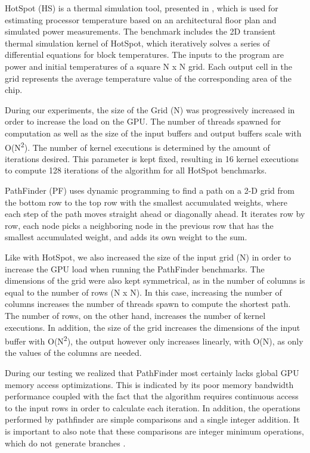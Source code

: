 HotSpot (HS) is a thermal simulation tool, presented in \cite{hotspot}, which is used for estimating processor temperature based on an architectural floor plan and simulated power measurements. The benchmark includes the 2D transient thermal simulation kernel of HotSpot, which iteratively solves a series of differential equations for block temperatures. The inputs to the program are power and initial temperatures of a square N x N grid. Each output cell in the grid represents the average temperature value of the corresponding area of the chip.

During our experiments, the size of the Grid (N) was progressively increased in order to increase the load on the GPU. The number of threads spawned for computation as well as the size of the input buffers and output buffers scale with O(N\textsuperscript{2}). The number of kernel executions is determined by the amount of iterations desired. This parameter is kept fixed, resulting in 16 kernel executions to compute 128 iterations of the algorithm for all HotSpot benchmarks.

PathFinder (PF) uses dynamic programming to find a path on a 2-D grid from the bottom row to the top row with the smallest accumulated weights, where each step of the path moves straight ahead or diagonally ahead. It iterates row by row, each node picks a neighboring node in the previous row that has the smallest accumulated weight, and adds its own weight to the sum.

Like with HotSpot, we also increased the size of the input grid (N) in order to increase the GPU load when running the PathFinder benchmarks. The dimensions of the grid were also kept symmetrical, as in the number of columns is equal to the number of rows (N x N). In this case, increasing the number of columns increases the number of threads spawn to compute the shortest path. The number of rows, on the other hand, increases the number of kernel executions. In addition, the size of the grid increases the dimensions of the input buffer with O(N\textsuperscript{2}), the output however only increases linearly, with O(N), as only the values of the columns are needed.

During our testing we realized that PathFinder most certainly lacks global GPU memory access optimizations. This is indicated by its poor memory bandwidth performance coupled with the fact that the algorithm requires continuous access to the input rows in order to calculate each iteration. In addition, the operations performed by pathfinder are simple comparisons and a single integer addition. It is important to also note that these comparisons are integer minimum operations, which do not generate branches \cite{ptx_isa}.

